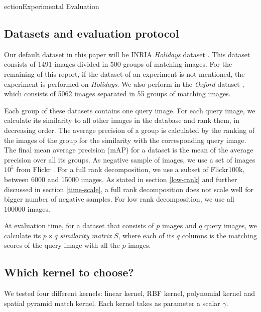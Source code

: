 ection{Experimental Evaluation}
\subsection{Datasets and evaluation protocol} \label{eval:protocol}
Our default dataset in this paper will be INRIA \emph{Holidays} dataset \cite{holidays}. This dataset consists of 1491 images divided in 500 groups of matching images. For the remaining of this report, if the dataset of an experiment is not mentioned, the experiment is performed on \emph{Holidays}.
We also perform in the \emph{Oxford} dataset \cite{oxford}, which consists of 5062 images separated in 55 groups of matching images.

Each group of these datasets contains one query image. 
For each query image, we calculate its similarity to all other images in the database and rank them, in decreasing order. 
The average precision of a group is calculated by the ranking of the images of the group for the similarity with the corresponding query image. 
The final mean average precision (mAP) for a dataset is the mean of the average precision over all its groups.
As negative sample of images, we use a set of images $10^5$ from Flickr \cite{oxford}. 
For a full rank decomposition, we use a subset of Flickr100k, between $6000$ and 15000 images. 
As stated in section \ref{low-rank} and further discussed in section \ref{time-scale}, a full rank decomposition does not scale well for bigger number of negative samples. For low rank decomposition, we use all 100000 images.

At evaluation time, for a dataset that consists of $p$ images and $q$ query images, we calculate its $p\times q$ \emph{similarity matrix} $S$, where each of its $q$ columns is the matching scores of the query image with all the $p$ images.


\subsection{Which kernel to choose?}
We tested four different kernels: linear kernel, RBF kernel, polynomial kernel and spatial pyramid match kernel. Each kernel takes as parameter a scalar $\gamma$.

